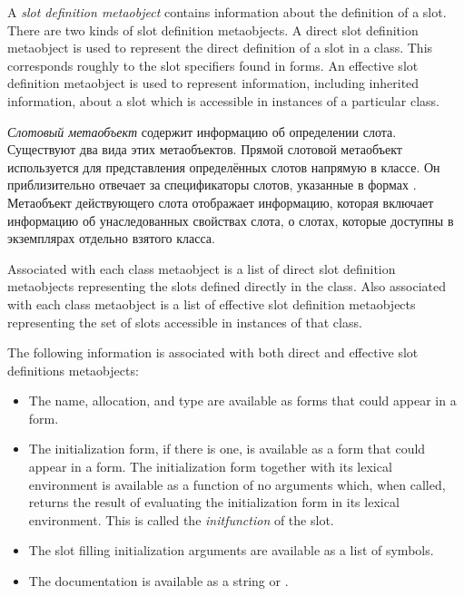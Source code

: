 A \emph{slot definition metaobject} contains information about the definition of a
slot. There are two kinds of slot definition metaobjects. A direct slot
definition metaobject is used to represent the direct definition of a slot in a
class. This corresponds roughly to the slot specifiers found in 
forms. An effective slot definition metaobject is used to represent information,
including inherited information, about a slot which is accessible in instances
of a particular class. 

\emph{Слотовый метаобъект} содержит информацию об определении слота. Существуют
два вида этих метаобъектов. Прямой слотовой метаобъект используется для
представления определённых слотов напрямую в классе. Он приблизительно отвечает
за спецификаторы слотов, указанные в формах . Метаобъект
действующего слота отображает информацию, которая включает информацию об
унаследованных свойствах слота, о слотах, которые доступны в экземплярах
отдельно взятого класса.

Associated with each class metaobject is a list of direct slot definition
metaobjects representing the slots defined directly in the class. Also
associated with each class metaobject is a list of effective slot definition
metaobjects representing the set of slots accessible in instances of that
class. 

The following information is associated with both direct and effective slot
definitions metaobjects: 

  \begin{itemize}
  \item 
    The name, allocation, and type are available as forms that could appear in a
     form.

  \item 
    The initialization form, if there is one, is available as a form that could
    appear in a  form. The initialization form together with its lexical
    environment is available as a function of no arguments which, when called,
    returns the result of evaluating the initialization form in its lexical
    environment. This is called the \emph{initfunction} of the slot.

  \item 
    The slot filling initialization arguments are available as a list of
    symbols. 

  \item 
    The documentation is available as a string or .

  \end{itemize}


